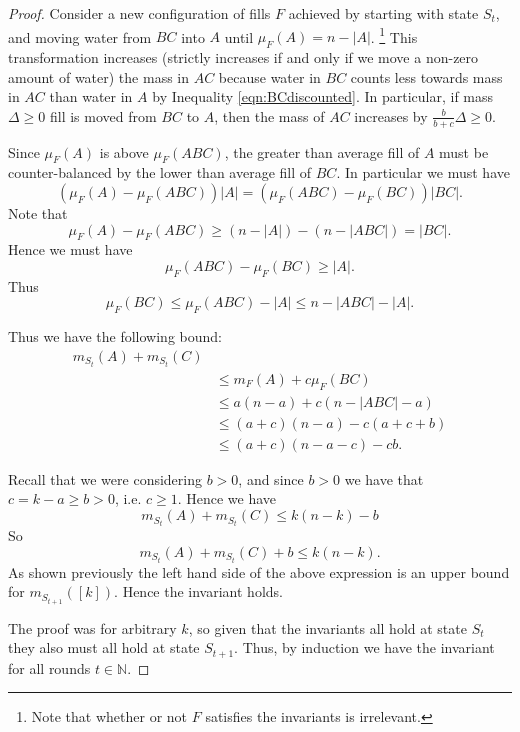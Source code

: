 \documentclass[twocolumn]{article}[10pt]
\begin{document}
\begin{proof}
{\color{blue}
  Consider a new configuration of fills $F$ achieved by starting with state
  $S_t$, and moving water from $BC$ into $A$ until $\mu_{F}(A) = n-|A|$.
  \footnote{Note that whether or not $F$ satisfies the invariants is irrelevant.}
  This transformation increases (strictly increases if and only if we move a
  non-zero amount of water) the mass in $AC$ because water in $BC$
  counts less towards mass in $AC$ than water in $A$ by Inequality
  \ref{eqn:BCdiscounted}. In particular, if mass $\Delta \ge 0$ fill is moved from
  $BC$ to $A$, then the mass of $AC$ increases by $\frac{b}{b+c} \Delta \ge 0$.

  Since $\mu_F(A)$ is above $\mu_{F}(ABC)$, the greater than average fill of
  $A$ must be counter-balanced by the lower than average fill of $BC$. In
  particular we must have
  $$(\mu_F(A) - \mu_F(ABC))|A| = (\mu_F(ABC) -\mu_F(BC))|BC|.$$
  Note that $$\mu_F(A) -\mu_F(ABC) \ge (n-|A|) - (n-|ABC|) = |BC|.$$
  Hence we must have 
  $$\mu_F(ABC) - \mu_F(BC) \ge |A|.$$
  Thus 
  $$\mu_F(BC) \le \mu_F(ABC) - |A| \le n-|ABC| -|A|.$$

  Thus we have the following bound:
  \begin{align*}
    m_{S_t}(A) + m_{S_t}(C)& \\
  &\le m_{F}(A) + c\mu_{F}(BC)\\
  &\le a(n-a) + c(n-|ABC|-a) \\
  &\le (a+c)(n-a) - c(a+c+b) \\
  &\le (a+c)(n-a-c) - cb.
  \end{align*}
}

Recall that we were considering $b> 0$, and since $b>0$ we have that $c = k-a
\ge b > 0$, i.e. $c \ge 1$. 
Hence we have 
$$m_{S_t}(A) + m_{S_t}(C) \le k(n-k) -b$$
So 
$$m_{S_t}(A) + m_{S_t}(C)+b \le k(n-k).$$
As shown previously the left hand side of the above expression is an upper
bound for $m_{S_{t+1}}([k])$.
Hence the invariant holds.

The proof was for arbitrary $k$, so given that the invariants all hold at state
$S_t$ they also must all hold at state $S_{t+1}$.
Thus, by induction we have the invariant for all rounds $t\in\mathbb{N}$.
\end{proof}
\end{document}
